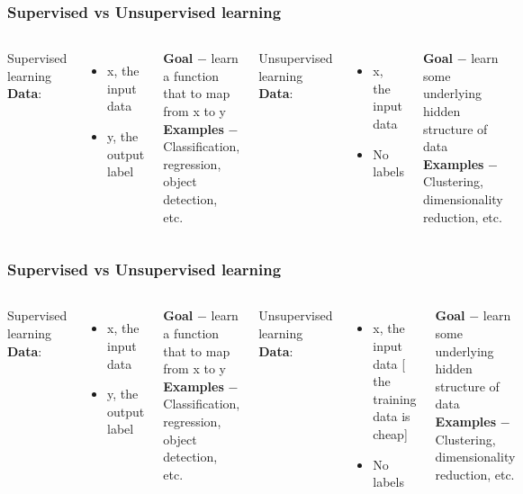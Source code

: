 \documentclass{beamer}
\begin{document}
\begin{frame}
    \frametitle{Supervised vs Unsupervised learning}
    \begin{columns}
            {\Large Supervised learning} \\
            \textbf{Data}:
            \begin{itemize}
                \item{x, the input data}
                \item{y, the output label}
            \end{itemize}
            \textbf{Goal} $-$ learn a function that to map from x to y \\
            \textbf{Examples} $-$ Classification, regression, object detection, etc.
        
            {\Large Unsupervised learning} \\
            \textbf{Data}:
            \begin{itemize}
                \item{x, the input data}
                \item{No labels}
            \end{itemize}
            \textbf{Goal} $-$ learn some underlying hidden structure of data\\
            \textbf{Examples} $-$  Clustering, dimensionality reduction, etc.
    \end{columns}
\end{frame}

\begin{frame}
    \frametitle{Supervised vs Unsupervised learning}
    \begin{columns}
            {\Large Supervised learning} \\
            \textbf{Data}:
            \begin{itemize}
                \item{x, the input data}
                \item{y, the output label}
            \end{itemize}
            \textbf{Goal} $-$ learn a function that to map from x to y \\
            \textbf{Examples} $-$ Classification, regression, object detection, etc.
        
            {\Large Unsupervised learning} \\
            \textbf{Data}:
            \begin{itemize}
                \item{x, the input data [{\small \color{blue} the training data is cheap}]}
                \item{No labels}
            \end{itemize}
            \textbf{Goal} $-$ learn some underlying hidden structure of data \\
            \textbf{Examples} $-$  Clustering, dimensionality reduction, etc.
    \end{columns}
\end{frame}
\end{document}
